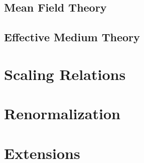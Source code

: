\subsection{Mean Field Theory}
\subsection{Effective Medium Theory}
\section{Scaling Relations}
\section{Renormalization}
\section{Extensions}

